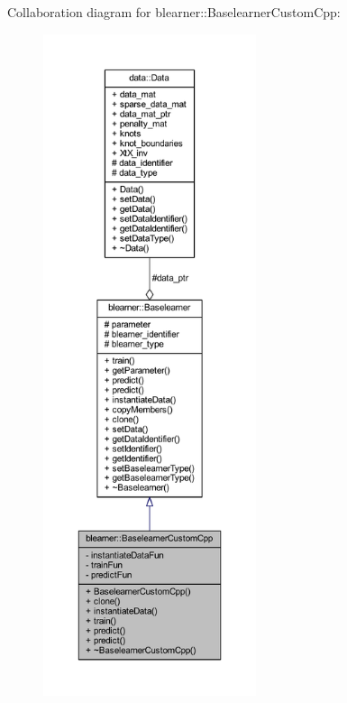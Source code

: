 Collaboration diagram for blearner\+:\+:Baselearner\+Custom\+Cpp\+:\nopagebreak
\begin{figure}[H]
\begin{center}
\leavevmode
\includegraphics[height=550pt]{classblearner_1_1_baselearner_custom_cpp__coll__graph}
\end{center}
\end{figure}

